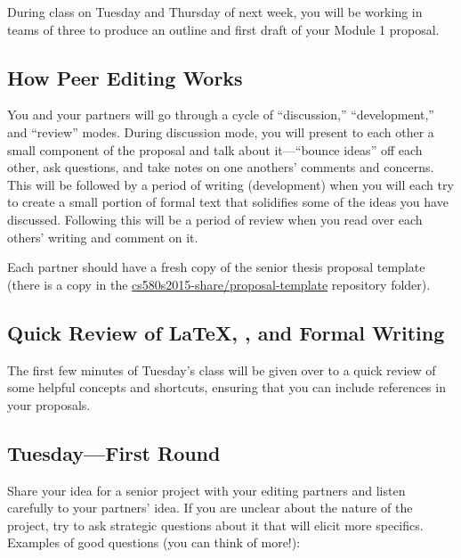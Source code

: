 
\usepackage[compact]{titlesec}




During class on Tuesday and Thursday of next week, you will be working in teams of three to produce an outline and first
draft of your Module 1 proposal.

\subsection*{How Peer Editing Works}

You and your partners will go through a cycle of ``discussion,'' ``development,'' and ``review''  modes.  During
discussion mode, you will present to each other a small component of the proposal and talk about it---``bounce ideas''
off each other, ask questions, and take notes on one anothers' comments and concerns.  This will be followed by a period
of writing (development) when you will each try to create a small portion of formal text that solidifies some of the
ideas you have discussed.  Following this will be a period of review when you read over each others' writing and comment
on it.

Each partner should have a fresh copy of the senior thesis proposal template
(there is a copy in the \url{cs580s2015-share/proposal-template} repository
folder).

\subsection*{Quick Review of \LaTeX, \BibTeX, and Formal Writing}

The first few minutes of Tuesday's class will be given over to a quick review of some helpful concepts and shortcuts,
ensuring that you can include references in your proposals.

\subsection*{Tuesday---First Round}

 Share your idea for a senior project with your editing
partners and listen carefully to your partners' idea. If you are unclear about
the nature of the project, try to ask strategic questions about it that will 
elicit more specifics. Examples of good questions (you can think of more!):

